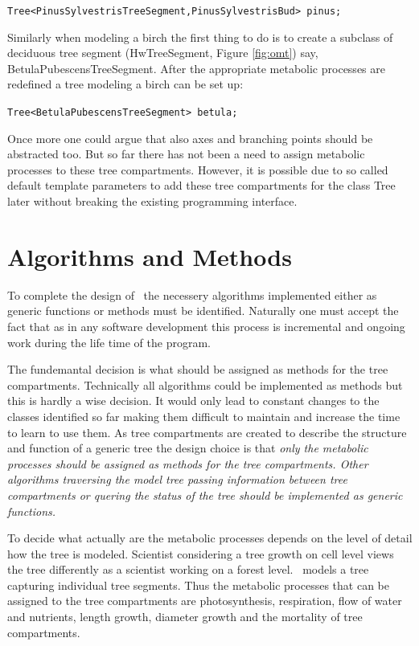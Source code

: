 \begin{center}
\tt Tree<PinusSylvestrisTreeSegment,PinusSylvestrisBud> pinus;\rm
\end{center}

Similarly when modeling a birch the  first thing to do  is to create a
subclass    of  deciduous    tree  segment    (HwTreeSegment,   Figure
\ref{fig:omt}) say,  BetulaPubescensTreeSegment.      After   the
appropriate metabolic processes are  redefined a tree modeling a birch
can be set up:

\begin{center}
\tt Tree<BetulaPubescensTreeSegment> betula;\rm
\end{center}




Once more one could argue  that also axes  and branching points should
be abstracted too.  But  so far there  has not been  a need  to assign
metabolic  processes  to these   tree   compartments.  However, it  is
possible   due to so called  default  template parameters to add these
tree  compartments for the    class Tree later  without   breaking the
existing programming interface.

\section{Algorithms and Methods}

To  complete the   design  of    \lignum\ the necessery     algorithms
implemented  either   as generic   functions     or methods must    be
identified. Naturally one must accept the fact that as in any software
development this  process is incremental and   ongoing work during the
life time of the program.

The fundemantal decision is what should be assigned as methods for the
tree compartments. Technically  all algorithms could be implemented as
methods but this is  hardly a wise decision.   It  would only lead  to
constant  changes  to  the  classes   identified  so far making   them
difficult to maintain and increase the time to learn  to use them.  As
tree compartments are created  to describe the structure  and function
of a  generic tree the design  choice  is that \it  only the metabolic
processes \rm should be assigned as methods for the tree compartments.
Other algorithms traversing the model tree passing information between
tree compartments or   quering  the  status  of the  tree  should   be
implemented as generic functions.

To decide what actually  are the  metabolic  processes depends  on the
level of detail how the tree is modeled.  Scientist considering a tree
growth on cell level views the tree differently as a scientist working
on a  forest level. \lignum\ models  a tree capturing  individual tree
segments.  Thus  the metabolic processes that can  be assigned  to the
tree  compartments are photosynthesis, respiration,  flow of water and
nutrients,  length growth, diameter growth  and  the mortality of tree
compartments.

